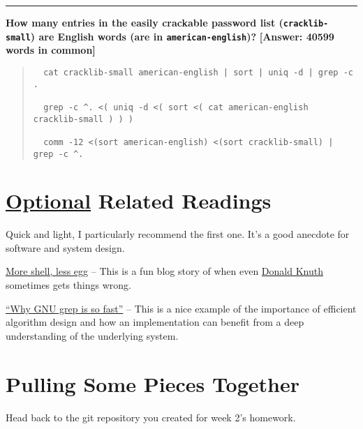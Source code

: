 \documentclass{article}
\begin{document}
\hrule
\smallskip
\noindent
\textbf{How many entries in the easily crackable password list
  (\texttt{cracklib-small}) are English words (are in
\texttt{american-english})?}
\hfill \textbf{[Answer: 40599 words in common]}

\begin{quote}
  \color{violet}
  \begin{lstlisting}
  cat cracklib-small american-english | sort | uniq -d | grep -c .

  grep -c ^. <( uniq -d <( sort <( cat american-english cracklib-small ) ) )

  comm -12 <(sort american-english) <(sort cracklib-small) | grep -c ^.
  \end{lstlisting}
\end{quote}

\vfill
\section*{\ul{Optional} Related Readings}
Quick and light, I particularly recommend the first one. It's a good anecdote
for software and system design.

\medskip
\noindent
\href{http://www.leancrew.com/all-this/2011/12/more-shell-less-egg/}{More
shell, less egg} -- This is a fun blog story of when even
\href{https://en.wikipedia.org/wiki/Donald_Knuth}{Donald Knuth} sometimes gets
things wrong.

\medskip
\noindent
\href{https://lists.freebsd.org/pipermail/freebsd-current/2010-August/019310.html}{``Why GNU grep is so fast''} --
This is a nice example of the importance of efficient algorithm design and how
an implementation can benefit from a deep understanding of the underlying
system.




\newpage

\section{Pulling Some Pieces Together}

\medskip
\noindent
Head back to the git repository you created for week 2's homework.
\end{document}
